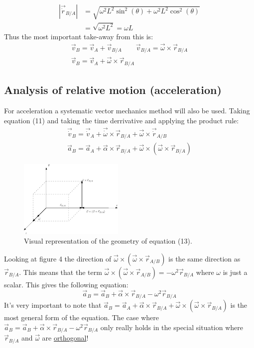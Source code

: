 \documentclass[11pt, a4paper]{article}
\begin{document}
\begin{align}
  |\vec{\dot{r}}_{B/A}| &= \sqrt{\omega^2L^2\sin^2(\theta) + \omega^2L^2\cos^2(\theta)}\\
                        &= \sqrt{\omega^2L^2} = \omega L
\end{align}
Thus the most important take-away from this is:
\begin{gather}
  \vec{v}_B = \vec{v}_A + \vec{v}_{B/A} \qquad \vec{v}_{B/A} = \vec{\omega} \times \vec{r}_{B/A}\\
  \vec{v}_B = \vec{v}_A + \vec{\omega} \times \vec{r}_{B/A}
\end{gather}

\subsection{Analysis of relative motion (acceleration)}
For acceleration a systematic vector mechanics method will also be used. Taking equation (11) and taking the time derrivative and applying the product rule:
\begin{gather}
  \vec{\dot{v}}_B = \vec{\dot{v}}_A + \vec{\dot{\omega}} \times \vec{r}_{B/A} + \vec{\omega} \times \vec{\dot{r}}_{A/B}\\
  \vec{a}_B = \vec{a}_A + \vec{\alpha} \times \vec{r}_{B/A} + \vec{\omega} \times (\vec{\omega} \times \vec{r}_{B/A})
\end{gather}
\begin{figure}[h]
  \centerline{\includegraphics[width=50mm]{images/Equation_13.png}}
  \caption{Visual representation of the geometry of equation (13).}
\end{figure}
Looking at figure 4 the direction of $\vec{\omega} \times (\vec{\omega} \times \vec{r}_{A/B})$ is the same direction as $\vec{r}_{B/A}$. This means that the term $\vec{\omega} \times (\vec{\omega} \times \vec{r}_{A/B}) = -\omega^2\vec{r}_{B/A}$ where $\omega$ is just a scalar. This gives the following equation:
\begin{equation}
  \vec{a}_B = \vec{a}_B + \vec{\alpha} \times \vec{r}_{B/A} - \omega^2\vec{r}_{B/A}
\end{equation}
It's very important to note that $\vec{a}_B = \vec{a}_A + \vec{\alpha} \times \vec{r}_{B/A} + \vec{\omega} \times (\vec{\omega} \times \vec{r}_{B/A})$ is the most general form of the equation. The case where $\vec{a}_B = \vec{a}_B + \vec{\alpha} \times \vec{r}_{B/A} - \omega^2\vec{r}_{B/A}$ only really holds in the special situation where $\vec{r}_{B/A}$ and $\vec{\omega}$ are \underline{orthogonal}!
\end{document}
